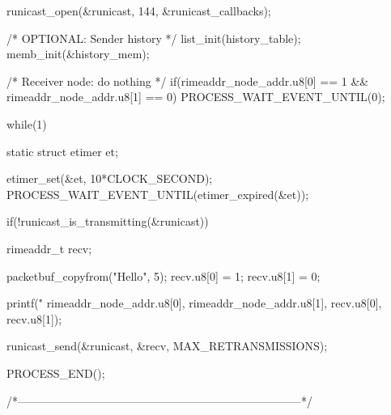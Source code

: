 \begin{DoxyCodeInclude}
{  runicast_open(&runicast, 144, &runicast_callbacks);

  /* OPTIONAL: Sender history */
  list_init(history_table);
  memb_init(&history_mem);

  /* Receiver node: do nothing */
  if(rimeaddr_node_addr.u8[0] == 1 &&
     rimeaddr_node_addr.u8[1] == 0) {
    PROCESS_WAIT_EVENT_UNTIL(0);
  }

  while(1) {
    static struct etimer et;

    etimer_set(&et, 10*CLOCK_SECOND);
    PROCESS_WAIT_EVENT_UNTIL(etimer_expired(&et));

    if(!runicast_is_transmitting(&runicast)) {
      rimeaddr_t recv;

      packetbuf_copyfrom("Hello", 5);
      recv.u8[0] = 1;
      recv.u8[1] = 0;

      printf("%
             rimeaddr_node_addr.u8[0],
             rimeaddr_node_addr.u8[1],
             recv.u8[0],
             recv.u8[1]);

      runicast_send(&runicast, &recv, MAX_RETRANSMISSIONS);
    }
  }

  PROCESS_END();
}
/*---------------------------------------------------------------------------*/
\end{DoxyCodeInclude}
 